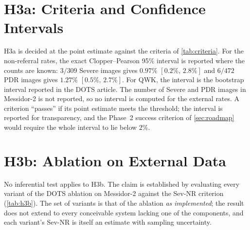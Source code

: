 \section{H3a: Criteria and Confidence Intervals}
H3a is decided at the point estimate against the criteria of \cref{tab:criteria}. For the
non-referral rates, the exact Clopper--Pearson 95\% interval is reported where the counts
are known: $3/309$ Severe images gives $0.97\%$ $[0.2\%,\,2.8\%]$ and $6/472$ PDR images
gives $1.27\%$ $[0.5\%,\,2.7\%]$. For QWK, the interval is the bootstrap interval reported in
the DOTS article. The number of Severe and PDR images in Messidor-2 is not reported, so no
interval is computed for the external rates. A criterion ``passes'' if its point estimate
meets the threshold; the interval is reported for transparency, and the Phase~2 success
criterion of \cref{sec:roadmap} would require the whole interval to lie below $2\%$.

\section{H3b: Ablation on External Data}
No inferential test applies to H3b. The claim is established by evaluating every variant
of the DOTS ablation on Messidor-2 against the Sev-NR criterion (\cref{tab:h3b}). The set of
variants is that of the ablation \emph{as implemented}; the result does not extend to every
conceivable system lacking one of the components, and each variant's Sev-NR is itself an
estimate with sampling uncertainty.

